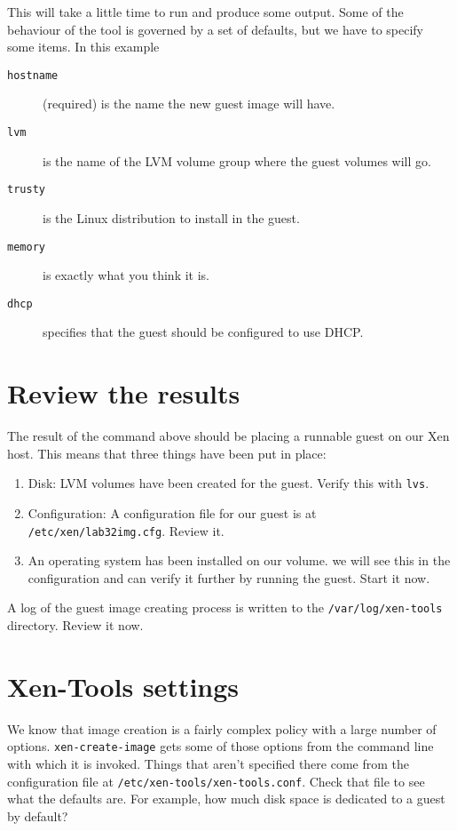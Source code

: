 \documentclass{article}
\begin{document}
This will take a little time to run and produce some output. Some of the behaviour of the tool is governed by
a set of defaults, but we have to specify some items. In this example

\begin{description}
\item[\texttt{hostname}] (required) is the name the new guest image will have.
\item[\texttt{lvm}] is the name of the LVM volume group where the guest volumes will go.
\item[\texttt{trusty}] is the Linux distribution to install in the guest.
\item[\texttt{memory}] is exactly what you think it is.
\item[\texttt{dhcp}] specifies that the guest should be configured to use DHCP.
\end{description}

\section{Review the results}
The result of the command above should be placing a runnable guest on our Xen host. This means that 
three things have been put in place:

\begin{enumerate}
 \item Disk: LVM volumes have been created for the guest. Verify this with \texttt{lvs}.
 \item Configuration: A configuration file for our guest is at \texttt{/etc/xen/lab32img.cfg}. Review it.
 \item An operating system has been installed on our volume. we will see this in the configuration
          and can verify it further by running the guest. Start it now.
\end{enumerate}       
   
A log of the guest image creating process is written to the \texttt{/var/log/xen-tools} directory. Review it now.

\section{Xen-Tools settings}
We know that image creation is a fairly complex policy with a large number of options. \texttt{xen-create-image} 
gets some of those options from the command line with which it is invoked. Things that aren't specified there 
come from the configuration file at \texttt{/etc/xen-tools/xen-tools.conf}. Check that file to see what the defaults
are. For example, how much disk space is dedicated to a guest by default?
\end{document}
